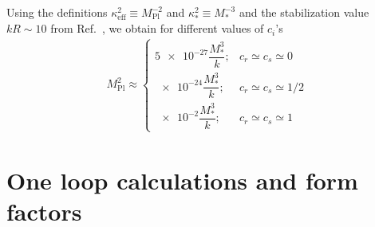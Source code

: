 \documentclass[twocolumn,showpacs,showkeys,prd,superscriptaddress]{revtex4-1}
\begin{document}

Using the definitions $\kappa_{\text{eff}}^2 \equiv M_{\text{Pl}}^{-2}$ and $\kappa_*^2 \equiv M_*^{-3}$ and the stabilization value $kR\sim10$ from Ref.~\cite{Goldberger:1999uk}, we obtain for different values of $c_i$'s
\begin{align}
  M_{\text{Pl}}^2 \approx 
  \begin{cases}    
    \num{5e-27}\dfrac{M_*^3}{k};  & c_r\simeq c_s\simeq 0 \\[2ex]
    \num{e-24}\dfrac{M_*^3}{k};  & c_r\simeq c_s\simeq 1/2 \\[2ex]
    \num{e-2}\dfrac{M_*^3}{k};  & c_r\simeq c_s\simeq 1 
  \end{cases}
\end{align}





%

\section{\label{sec:oneloop}One loop calculations and form factors}
\end{document}
